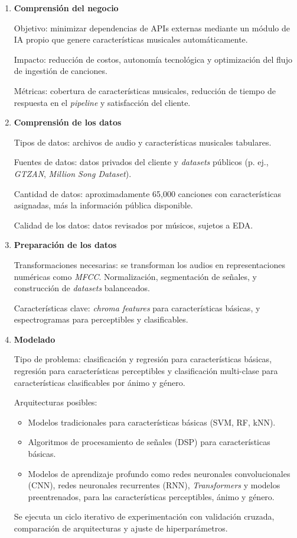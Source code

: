 \documentclass[
11pt, %
]{charter}
\begin{document}
\begin{enumerate}
  \item \textbf{Comprensión del negocio} 
  
  Objetivo: minimizar dependencias de APIs externas mediante un módulo de IA propio que genere características musicales automáticamente.  
  
  Impacto: reducción de costos, autonomía tecnológica y optimización del flujo de ingestión de canciones.  
  
  Métricas: cobertura de características musicales, reducción de tiempo de respuesta en el \textit{pipeline} y satisfacción del cliente.
  
  \item \textbf{Comprensión de los datos}

  Tipos de datos: archivos de audio y características musicales tabulares.

  Fuentes de datos: datos privados del cliente y \textit{datasets} públicos (p. ej., \textit{GTZAN}, \textit{Million Song Dataset}).

  Cantidad de datos: aproximadamente 65,000 canciones con características asignadas, más la información pública disponible.

  Calidad de los datos: datos revisados por músicos, sujetos a EDA.

  \item \textbf{Preparación de los datos}

  Transformaciones necesarias: se transforman los audios en representaciones numéricas como \textit{MFCC}. Normalización, segmentación de señales, y construcción de \textit{datasets} balanceados.

  Características clave: \textit{chroma features} para características básicas, y espectrogramas para perceptibles y clasificables.
  \vspace{3cm}
  \item \textbf{Modelado}

  Tipo de problema: clasificación y regresión para características básicas, regresión para características perceptibles y clasificación multi-clase para características clasificables por ánimo y género.

  Arquitecturas posibles:
  \begin{itemize}
    \item Modelos tradicionales para características básicas (SVM, RF, kNN).
    \item Algoritmos de procesamiento de señales (DSP) para características básicas.
    \item Modelos de aprendizaje profundo como redes neuronales convolucionales (CNN),  redes neuronales recurrentes (RNN), \textit{Transformers} y modelos preentrenados, para las características perceptibles, ánimo y género.
  \end{itemize}
  Se ejecuta un ciclo iterativo de experimentación con validación cruzada, comparación de arquitecturas y ajuste de hiperparámetros.


\end{enumerate}
\end{document}
